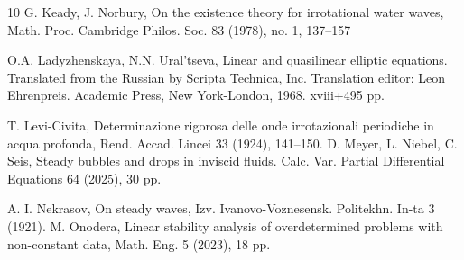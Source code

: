 \documentclass[reqno]{amsart}
\numberwithin{equation}{section}
\numberwithin{equation}{section}
\numberwithin{equation}{section}
\begin{document}
\begin{thebibliography}{10}
 G. Keady, J. Norbury, On the existence theory for irrotational water waves, Math. Proc.
Cambridge Philos. Soc. 83 (1978), no. 1, 137--157



O.A. Ladyzhenskaya, N.N. Ural'tseva, Linear and quasilinear elliptic
equations. Translated from the Russian by Scripta Technica, Inc.
Translation editor: Leon Ehrenpreis. Academic Press, New
York-London, 1968. xviii+495 pp.

 T. Levi-Civita, Determinazione rigorosa delle onde irrotazionali periodiche in acqua profonda,
Rend. Accad. Lincei 33 (1924), 141--150.
D. Meyer, L. Niebel, C. Seis, Steady bubbles and drops in inviscid fluids. Calc. Var. Partial Differential Equations 64 (2025), 30 pp.

 A. I. Nekrasov, On steady waves, Izv. Ivanovo-Voznesensk. Politekhn. In-ta 3 (1921).
 M. Onodera, Linear stability analysis of overdetermined problems with non-constant data, Math. Eng. 5 (2023), 18 pp.


\end{thebibliography}
\end{document}
